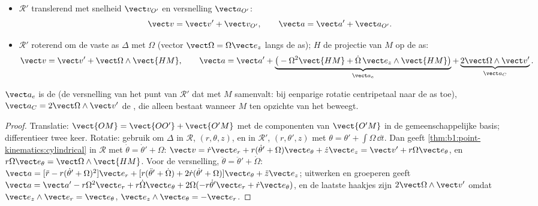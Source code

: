 \begin{theorem}\label{thm:b1:non-inertial-frames:composition}
\begin{itemize}
  \item $\mathcal R'$ translerend met snelheid $\vect v_{O'}$ en
        versnelling $\vect a_{O'}$:
        \[
        \vect v = \vect v' + \vect v_{O'}, \qquad \vect a = \vect a' + \vect a_{O'} .
        \]
  \item $\mathcal R'$ roterend om de vaste as $\Delta$ met $\Omega$ (vector
        $\vect\Omega = \Omega\vect e_z$ langs de as); $H$ de projectie
        van $M$ op de as:
        \[
        \vect v = \vect v' + \vect\Omega\wedge\vect{HM}, \qquad
        \vect a = \vect a' + \underbrace{\big(-\Omega^2\vect{HM} + \dot\Omega\,\vect e_z\wedge\vect{HM}\big)}_{\vect a_e}
        + \underbrace{2\vect\Omega\wedge\vect v'}_{\vect a_C} .
        \]
\end{itemize}
$\vect a_e$ is de \emph{} (de versnelling van het
punt van $\mathcal R'$ dat met $M$ samenvalt: bij eenparige rotatie centripetaal
naar de as toe), $\vect a_C = 2\vect\Omega\wedge\vect v'$ de
\emph{}, die alleen bestaat wanneer $M$ ten opzichte van het
 beweegt.
\end{theorem}

\begin{proof}
Translatie: $\vect{OM} = \vect{OO'} + \vect{O'M}$ met de componenten van
$\vect{O'M}$ in de gemeenschappelijke basis; differentieer twee keer. Rotatie: gebruik
 om $\Delta$ in $\mathcal R$, $(r, \theta, z)$, en
in $\mathcal R'$, $(r, \theta', z)$ met $\theta = \theta' + \int\Omega\,\dd t$.
Dan geeft \cref{thm:b1:point-kinematics:cylindrical} in $\mathcal R$ met
$\dot\theta = \dot\theta' + \Omega$:
$\vect v = \dot r\vect e_r + r(\dot\theta' + \Omega)\vect e_\theta + \dot z\vect e_z
= \vect v' + r\Omega\vect e_\theta$, en $r\Omega\vect e_\theta = \vect\Omega\wedge\vect{HM}$.
Voor de versnelling, $\ddot\theta = \ddot\theta' + \dot\Omega$:
$\vect a = [\ddot r - r(\dot\theta' + \Omega)^2]\vect e_r + [r(\ddot\theta' + \dot\Omega)
+ 2\dot r(\dot\theta' + \Omega)]\vect e_\theta + \ddot z\vect e_z$; uitwerken en
groeperen geeft $\vect a = \vect a' - r\Omega^2\vect e_r + r\dot\Omega\vect e_\theta
+ 2\Omega(-r\dot\theta'\vect e_r + \dot r\vect e_\theta)$, en de laatste haakjes zijn
$2\vect\Omega\wedge\vect v'$ omdat $\vect e_z\wedge\vect e_r = \vect e_\theta$,
$\vect e_z\wedge\vect e_\theta = -\vect e_r$.
\end{proof}

